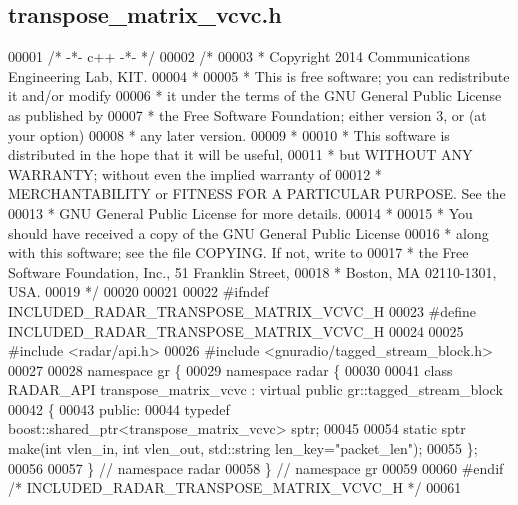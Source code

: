 \subsection{transpose\+\_\+matrix\+\_\+vcvc.\+h}
\label{transpose__matrix__vcvc_8h_source}

\begin{DoxyCode}
00001 \textcolor{comment}{/* -*- c++ -*- */}
00002 \textcolor{comment}{/* }
00003 \textcolor{comment}{ * Copyright 2014 Communications Engineering Lab, KIT.}
00004 \textcolor{comment}{ * }
00005 \textcolor{comment}{ * This is free software; you can redistribute it and/or modify}
00006 \textcolor{comment}{ * it under the terms of the GNU General Public License as published by}
00007 \textcolor{comment}{ * the Free Software Foundation; either version 3, or (at your option)}
00008 \textcolor{comment}{ * any later version.}
00009 \textcolor{comment}{ * }
00010 \textcolor{comment}{ * This software is distributed in the hope that it will be useful,}
00011 \textcolor{comment}{ * but WITHOUT ANY WARRANTY; without even the implied warranty of}
00012 \textcolor{comment}{ * MERCHANTABILITY or FITNESS FOR A PARTICULAR PURPOSE.  See the}
00013 \textcolor{comment}{ * GNU General Public License for more details.}
00014 \textcolor{comment}{ * }
00015 \textcolor{comment}{ * You should have received a copy of the GNU General Public License}
00016 \textcolor{comment}{ * along with this software; see the file COPYING.  If not, write to}
00017 \textcolor{comment}{ * the Free Software Foundation, Inc., 51 Franklin Street,}
00018 \textcolor{comment}{ * Boston, MA 02110-1301, USA.}
00019 \textcolor{comment}{ */}
00020 
00021 
00022 \textcolor{preprocessor}{#ifndef INCLUDED\_RADAR\_TRANSPOSE\_MATRIX\_VCVC\_H}
00023 \textcolor{preprocessor}{#define INCLUDED\_RADAR\_TRANSPOSE\_MATRIX\_VCVC\_H}
00024 
00025 \textcolor{preprocessor}{#include <radar/api.h>}
00026 \textcolor{preprocessor}{#include <gnuradio/tagged\_stream\_block.h>}
00027 
00028 \textcolor{keyword}{namespace }gr \{
00029   \textcolor{keyword}{namespace }radar \{
00030 
00041     \textcolor{keyword}{class }RADAR_API transpose_matrix_vcvc : \textcolor{keyword}{virtual} \textcolor{keyword}{public} gr::tagged\_stream\_block
00042     \{
00043      \textcolor{keyword}{public}:
00044       \textcolor{keyword}{typedef} boost::shared\_ptr<transpose\_matrix\_vcvc> sptr;
00045 
00054       \textcolor{keyword}{static} sptr make(\textcolor{keywordtype}{int} vlen\_in, \textcolor{keywordtype}{int} vlen\_out, std::string len\_key=\textcolor{stringliteral}{"packet\_len"});
00055     \};
00056 
00057   \} \textcolor{comment}{// namespace radar}
00058 \} \textcolor{comment}{// namespace gr}
00059 
00060 \textcolor{preprocessor}{#endif }\textcolor{comment}{/* INCLUDED\_RADAR\_TRANSPOSE\_MATRIX\_VCVC\_H */}\textcolor{preprocessor}{}
00061 
\end{DoxyCode}
